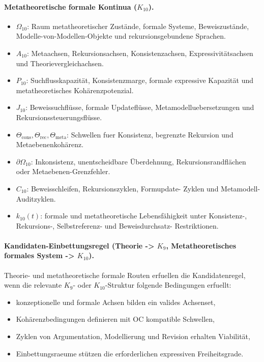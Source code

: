 \paragraph{Metatheoretische formale Kontinua (\texorpdfstring{\(K_{10}\)}{K10}).}
\begin{itemize}
  \item \(\Omega_{10}\): Raum metatheoretischer Zustände, formale
        Systeme, Beweiszustände, Modelle-von-Modellen-Objekte und
        rekursionsgebundene Sprachen.
  \item \(A_{10}\): Metaachsen, Rekursionsachsen, Konsistenzachsen,
        Expressivitätsachsen und Theorievergleichachsen.
  \item \(P_{10}\): Suchflusskapazität, Konsistenzmarge, formale
        expressive Kapazität und metatheoretisches Kohärenzpotenzial.
  \item \(J_{10}\): Beweissuchflüsse, formale Updateflüsse,
        Metamodelluebersetzungen und Rekursionssteuerungsflüsse.
  \item \(\Theta_{\mathrm{cons}}, \Theta_{\mathrm{rec}}, \Theta_{\mathrm{meta}}\):
        Schwellen fuer Konsistenz, begrenzte Rekursion und Metaebenenkohärenz.
  \item \(\partial\Omega_{10}\): Inkonsistenz, unentscheidbare Überdehnung,
        Rekursionsrandflächen oder Metaebenen-Grenzfehler.
  \item \(C_{10}\): Beweisschleifen, Rekursionszyklen, Formupdate-
        Zyklen und Metamodell-Auditzyklen.
  \item \(k_{10}(t)\): formale und metatheoretische Lebensfähigkeit unter
        Konsistenz-, Rekursions-, Selbstreferenz- und Beweisdurchsatz-
        Restriktionen.
\end{itemize}

\paragraph{Kandidaten-Einbettungsregel (Theorie -> \texorpdfstring{\(K_9\)}{K9},
Metatheoretisches formales System -> \texorpdfstring{\(K_{10}\)}{K10}).}
Theorie- und metatheoretische formale Routen erfuellen die Kandidatenregel,
wenn die relevante \(K_9\)- oder \(K_{10}\)-Struktur folgende
Bedingungen erfuellt:
\begin{itemize}
  \item konzeptionelle und formale Achsen bilden ein valides Achsenset,
  \item Kohärenzbedingungen definieren mit OC kompatible Schwellen,
  \item Zyklen von Argumentation, Modellierung und Revision erhalten
        Viabilität,
  \item Einbettungsraeume stützen die erforderlichen expressiven Freiheitsgrade.
\end{itemize}

